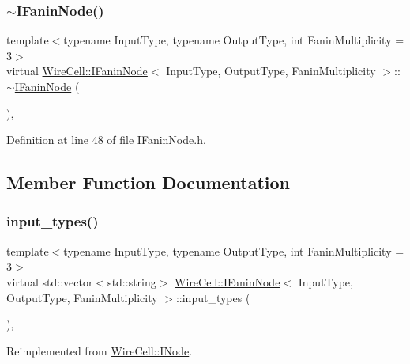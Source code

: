 \subsubsection{\texorpdfstring{$\sim$\+I\+Fanin\+Node()}{~IFaninNode()}}
{\footnotesize\ttfamily template$<$typename Input\+Type, typename Output\+Type, int Fanin\+Multiplicity = 3$>$ \\
virtual \hyperlink{class_wire_cell_1_1_i_fanin_node}{Wire\+Cell\+::\+I\+Fanin\+Node}$<$ Input\+Type, Output\+Type, Fanin\+Multiplicity $>$\+::$\sim$\hyperlink{class_wire_cell_1_1_i_fanin_node}{I\+Fanin\+Node} (\begin{DoxyParamCaption}{ }\end{DoxyParamCaption})\hspace{0.3cm}{\ttfamily [inline]}, {\ttfamily [virtual]}}



Definition at line 48 of file I\+Fanin\+Node.\+h.



\subsection{Member Function Documentation}
\mbox{\label{class_wire_cell_1_1_i_fanin_node_a102c43a647e2e0070e329c397e27c2f5}} 
\subsubsection{\texorpdfstring{input\+\_\+types()}{input\_types()}}
{\footnotesize\ttfamily template$<$typename Input\+Type, typename Output\+Type, int Fanin\+Multiplicity = 3$>$ \\
virtual std\+::vector$<$std\+::string$>$ \hyperlink{class_wire_cell_1_1_i_fanin_node}{Wire\+Cell\+::\+I\+Fanin\+Node}$<$ Input\+Type, Output\+Type, Fanin\+Multiplicity $>$\+::input\+\_\+types (\begin{DoxyParamCaption}{ }\end{DoxyParamCaption})\hspace{0.3cm}{\ttfamily [inline]}, {\ttfamily [virtual]}}



Reimplemented from \hyperlink{class_wire_cell_1_1_i_node_ae13fc140c8e815fac9327dfa5b43f853}{Wire\+Cell\+::\+I\+Node}.



